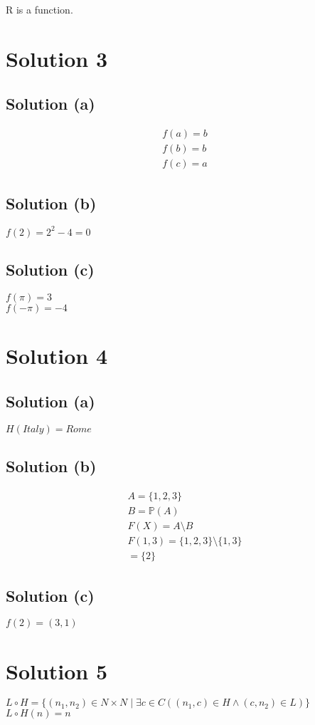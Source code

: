 \documentclass{article}
\begin{document}
R is a function.

\section{Solution 3}
\subsection{Solution (a)}
\begin{align*}
  f(a) = b \\
  f(b) = b \\
  f(c) = a
\end{align*}

\subsection{Solution (b)}
$f(2) = 2^2 - 4 = 0$

\subsection{Solution (c)}
$f(\pi) = 3$ \\
$f(-\pi) = -4$

\section{Solution 4}
\subsection{Solution (a)}
$H(Italy) = Rome$

\subsection{Solution (b)}
\begin{align*}
  A = \{1,2,3\} \\
  B = \mathbb{P}(A) \\
  F(X) = A \setminus B \\
  F({1,3}) = \{1,2,3\} \setminus \{1,3\} \\
           = \{2\}
\end{align*}

\subsection{Solution (c)}
$f(2) = (3,1)$

\section{Solution 5}
$L \circ H = \{(n_1, n_2) \in N \times N \mid \exists c \in C((n_1,c)
\in H \land (c,n_2) \in L)\}$ \\
$L \circ H (n) = n$ \\
\end{document}
